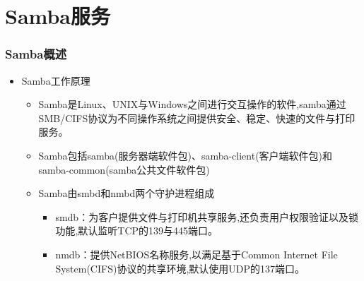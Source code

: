 \documentclass[xcolor=svgnames,presentation]{beamer}
\begin{document}
\section{Samba服务}
\label{sec-2}
\begin{frame}
\frametitle{Samba概述}
\label{sec-2-1}
\begin{itemize}

\item Samba工作原理
\label{sec-2-1-1}%
\begin{itemize}

\item Samba是Linux、UNIX与Windows之间进行交互操作的软件,samba通过SMB/CIFS协议为不同操作系统之间提供安全、稳定、快速的文件与打印服务。
\label{sec-2-1-1-1}%

\item Samba包括samba(服务器端软件包)、samba-client(客户端软件包)和samba-common(samba公共文件软件包)
\label{sec-2-1-1-2}%

\item Samba由smbd和nmbd两个守护进程组成
\label{sec-2-1-1-3}%
\begin{itemize}

\item smdb：为客户提供文件与打印机共享服务,还负责用户权限验证以及锁功能,默认监听TCP的139与445端口。
\label{sec-2-1-1-3-1}%

\item nmdb：提供NetBIOS名称服务,以满足基于Common Internet File System(CIFS)协议的共享环境,默认使用UDP的137端口。
\label{sec-2-1-1-3-2}%
\end{itemize} %
\end{itemize} %
\end{itemize} %
\end{frame}
\end{document}
